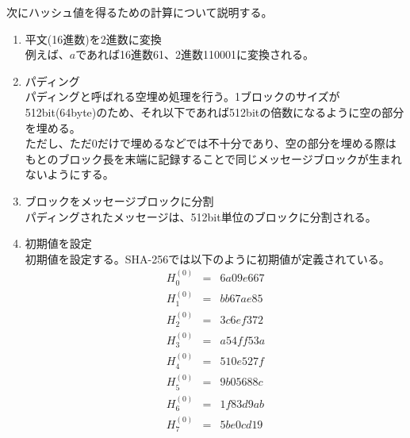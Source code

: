 \documentclass{thesis}
\begin{document}
次にハッシュ値を得るための計算について説明する。

\begin{enumerate}
\item 平文(16進数)を2進数に変換 \\
例えば、$a$であれば16進数61、2進数110001に変換される。
\item パディング \\
パディングと呼ばれる空埋め処理を行う。1ブロックのサイズが512bit(64byte)のため、それ以下であれば512bitの倍数になるように空の部分を埋める。\\
ただし、ただ0だけで埋めるなどでは不十分であり、空の部分を埋める際はもとのブロック長を末端に記録することで同じメッセージブロックが生まれないようにする。
\item ブロックをメッセージブロックに分割 \\
パディングされたメッセージは、512bit単位のブロックに分割される。
\item 初期値を設定 \\
初期値を設定する。SHA-256では以下のように初期値が定義されている。
\begin{eqnarray*}
H_0^{(0)} &=& 6a09e667 \\
H_1^{(0)} &=& bb67ae85 \\
H_2^{(0)} &=& 3c6ef372 \\
H_3^{(0)} &=& a54ff53a \\
H_4^{(0)} &=& 510e527f \\
H_5^{(0)} &=& 9b05688c \\
H_6^{(0)} &=& 1f83d9ab \\
H_7^{(0)} &=& 5be0cd19
\end{eqnarray*}


\end{enumerate}
\end{document}
